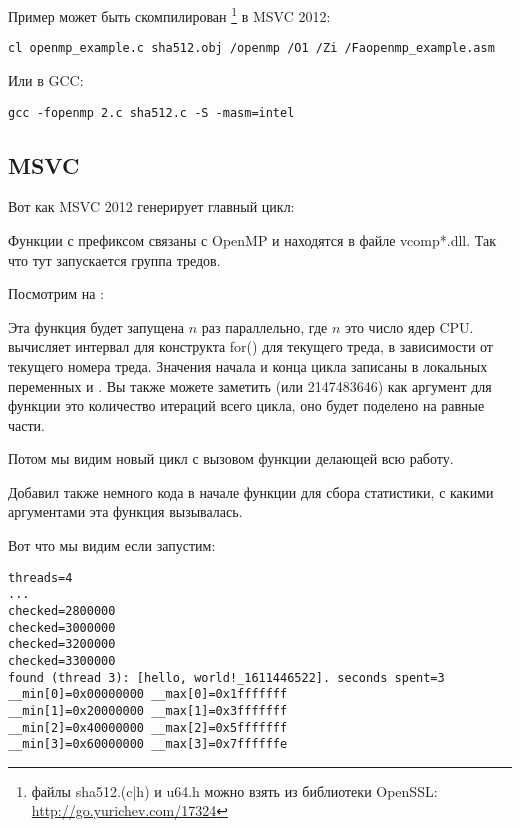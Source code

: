 Пример может быть скомпилирован
\footnote{файлы sha512.(c|h) и u64.h можно взять из библиотеки OpenSSL:
\url{http://go.yurichev.com/17324}}
в MSVC 2012:

\begin{lstlisting}
cl openmp_example.c sha512.obj /openmp /O1 /Zi /Faopenmp_example.asm
\end{lstlisting}

Или в GCC:

\begin{lstlisting}
gcc -fopenmp 2.c sha512.c -S -masm=intel
\end{lstlisting}

\subsection{MSVC}

Вот как MSVC 2012 генерирует главный цикл:



Функции с префиксом  связаны с OpenMP и находятся в файле vcomp*.dll.
Так что тут запускается группа тредов.

Посмотрим на :



Эта функция будет запущена $n$ раз параллельно, где $n$ это число ядер \ac{CPU}.\\
 вычисляет интервал для конструкта
for() для текущего треда, в зависимости от текущего номера треда.
Значения начала и конца цикла записаны в локальных переменных  и .
Вы также можете заметить  (или 2147483646) как аргумент для функции 
это количество итераций всего цикла, оно будет поделено на равные части.

Потом мы видим новый цикл с вызовом функции  делающей всю работу.

Добавил также немного кода в начале функции  для сбора статистики,
с какими аргументами эта функция вызывалась.

Вот что мы видим если запустим:

\begin{lstlisting}
threads=4
...
checked=2800000
checked=3000000
checked=3200000
checked=3300000
found (thread 3): [hello, world!_1611446522]. seconds spent=3
__min[0]=0x00000000 __max[0]=0x1fffffff
__min[1]=0x20000000 __max[1]=0x3fffffff
__min[2]=0x40000000 __max[2]=0x5fffffff
__min[3]=0x60000000 __max[3]=0x7ffffffe
\end{lstlisting}

